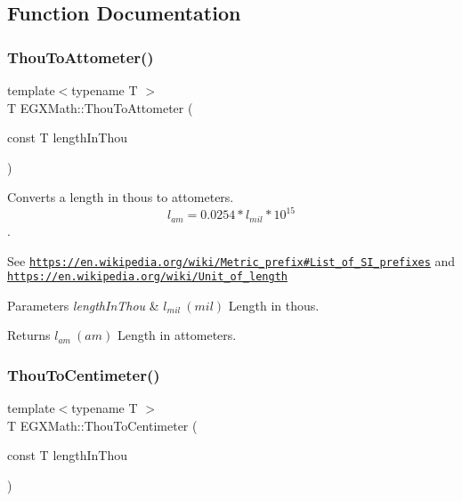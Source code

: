 \subsection{Function Documentation}
\mbox{\label{group___e_g_x_math-_conversions-_length_conversions-_imperial-_thou-_s_i_ga6e15cb5df637254290eebc91c3e2867d}} 
\subsubsection{\texorpdfstring{Thou\+To\+Attometer()}{ThouToAttometer()}}
{\footnotesize\ttfamily template$<$typename T $>$ \\
T E\+G\+X\+Math\+::\+Thou\+To\+Attometer (\begin{DoxyParamCaption}\item[{const T}]{length\+In\+Thou }\end{DoxyParamCaption})}



Converts a length in thous to attometers. \[ l_{am}=0.0254 * l_{mil} * 10^{15} \]. 

See \href{https://en.wikipedia.org/wiki/Metric_prefix#List_of_SI_prefixes}{\tt https\+://en.\+wikipedia.\+org/wiki/\+Metric\+\_\+prefix\#\+List\+\_\+of\+\_\+\+S\+I\+\_\+prefixes} and \href{https://en.wikipedia.org/wiki/Unit_of_length}{\tt https\+://en.\+wikipedia.\+org/wiki/\+Unit\+\_\+of\+\_\+length} 
\begin{DoxyParams}{Parameters}
{\em length\+In\+Thou} & $ l_{mil}\ (mil)$ Length in thous. \\
\hline
\end{DoxyParams}
\begin{DoxyReturn}{Returns}
$ l_{am}\ (am)$ Length in attometers. 
\end{DoxyReturn}
\mbox{\label{group___e_g_x_math-_conversions-_length_conversions-_imperial-_thou-_s_i_ga8c02f5046eede6e801c206cbd02d1055}} 
\subsubsection{\texorpdfstring{Thou\+To\+Centimeter()}{ThouToCentimeter()}}
{\footnotesize\ttfamily template$<$typename T $>$ \\
T E\+G\+X\+Math\+::\+Thou\+To\+Centimeter (\begin{DoxyParamCaption}\item[{const T}]{length\+In\+Thou }\end{DoxyParamCaption})}



